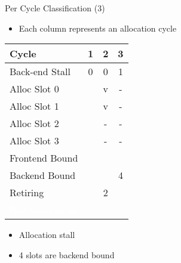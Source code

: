 \documentclass[aspectratio=169,10pt]{beamer}
\begin{document}
\begin{frame}{Per Cycle Classification (3)}
\begin{itemize}
  \item Each column represents an allocation cycle
\end{itemize}

\begin{center}
\begin{tabular}{|l|c|c|c|}
\hline
\rowcolor{red!20} Cycle & 1 & 2 & 3 \\
\hline
\rowcolor{red!20} Back-end Stall & 0 & 0 & 1 \\
\hline
\rowcolor{greenbar!50} Alloc Slot 0 & & v & - \\
\hline
\rowcolor{greenbar!50} Alloc Slot 1 & & v & - \\
\hline
\rowcolor{greenbar!50} Alloc Slot 2 & & - & - \\
\hline
\rowcolor{greenbar!50} Alloc Slot 3 & & - & - \\
\hline
\rowcolor{frontendbound} Frontend Bound & & & \\
\hline
\rowcolor{backendbound} Backend Bound & & & 4 \\
\hline
\rowcolor{retiring} Retiring & & 2 & \\
\hline
\rowcolor{badspec} \textcolor{white}{Bad Speculation} & & & \\
\hline
\end{tabular}
\end{center}

\begin{itemize}
  \item Allocation stall
  \item 4 slots are backend bound
\end{itemize}
\end{frame}
\end{document}
